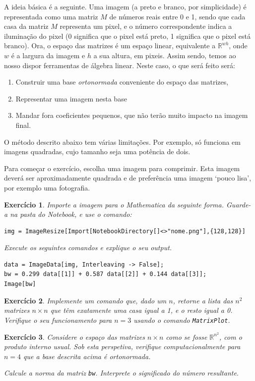 \documentclass{article}
\newtheorem{ex}{Exercício}[section]
\newcommand{\R}{\mathbb{R}}
\begin{document}
A ideia básica é a seguinte. Uma imagem (a preto e branco, por simplicidade) é representada como uma matriz $M$ de números reais entre 0 e 1, sendo que cada casa da matriz $M$ representa um pixel, e o número correspondente indica a iluminação do pixel (0 significa que o pixel está preto, 1 significa que o pixel está branco). Ora, o espaço das matrizes é um espaço linear, equivalente a $\R^{wh}$, onde $w$ é a largura da imagem e $h$ a sua altura, em pixeis. Assim sendo, temos ao nosso dispor ferramentas de álgebra linear. Neste caso, o que será feito será:
\begin{enumerate}
\item Construir uma base \emph{ortonormada} conveniente do espaço das matrizes,
\item Representar uma imagem nesta base
\item Mandar fora coeficientes pequenos, que não terão muito impacto na imagem final.
\end{enumerate}

O método descrito abaixo tem várias limitações. Por exemplo, só funciona em imagens quadradas, cujo tamanho seja uma potência de dois.

Para começar o exercício, escolha uma imagem para comprimir. Esta imagem deverá ser aproximadamente quadrada e	 de preferência uma imagem `pouco lisa', por exemplo uma fotografia.

\begin{ex}
Importe a imagem para o Mathematica da seguinte forma. Guarde-a na pasta do Notebook, e use o comando:
\begin{verbatim}
img = ImageResize[Import[NotebookDirectory[]<>"nome.png"],{128,128}]
\end{verbatim}

Execute os seguintes comandos e explique o seu output.
\begin{verbatim}
data = ImageData[img, Interleaving -> False];
bw = 0.299 data[[1]] + 0.587 data[[2]] + 0.144 data[[3]];
Image[bw]
\end{verbatim}
\end{ex}

\begin{ex}
Implemente um comando que, dado um $n$, retorne a lista das $n^2$ matrizes $n \times n$ que têm exatamente uma casa igual a 1, e o resto igual a 0. Verifique o seu funcionamento para $n = 3$ usando o comando \texttt{MatrixPlot}.
\end{ex}

\begin{ex}
Considere o espaço das matrizes $n \times n$ como se fosse $\R^{n^2}$, com o produto interno usual. Sob esta perspetiva, verifique computacionalmente para $n=4$ que a base descrita acima é ortonormada.

Calcule a norma da matriz \texttt{bw}. Interprete o significado do número resultante.
\end{ex}
\end{document}
